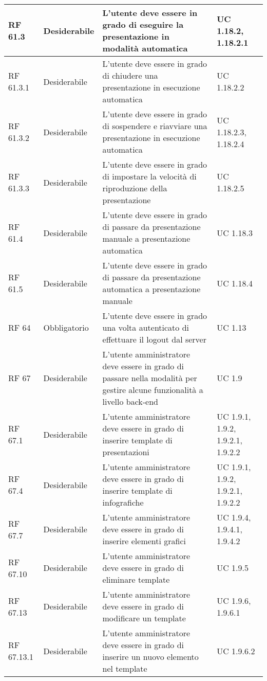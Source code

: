 {\begin{longtable} [c]{| p{2.5cm} | p{2.5cm} | p{6cm} |p{2.5cm}|}
			\hline
			RF 61.3 & Desiderabile & L'utente deve essere in grado di eseguire la presentazione in modalità automatica & UC 1.18.2, 1.18.2.1\\
			\hline
			RF 61.3.1 & Desiderabile & L'utente deve essere in grado di chiudere una presentazione in esecuzione automatica & UC 1.18.2.2\\
			\hline
			RF 61.3.2 & Desiderabile & L'utente deve essere in grado di sospendere e riavviare una presentazione in esecuzione automatica & UC 1.18.2.3, 1.18.2.4\\
			\hline
			RF 61.3.3 & Desiderabile & L'utente deve essere in grado di impostare la velocità di riproduzione della presentazione & UC 1.18.2.5\\
			\hline
			RF 61.4 & Desiderabile & L'utente deve essere in grado di passare da presentazione manuale a presentazione automatica & UC 1.18.3\\
			\hline
			RF 61.5 & Desiderabile & L'utente deve essere in grado di passare da presentazione automatica a presentazione manuale & UC 1.18.4\\
			\hline
			RF 64 & Obbligatorio & L'utente deve essere in grado una volta autenticato di effettuare il logout dal server & UC 1.13\\
			\hline
			RF 67 & Desiderabile & L'utente amministratore deve essere in grado di passare nella modalità per gestire alcune funzionalità a livello back-end & UC 1.9\\
			\hline
			RF 67.1 & Desiderabile & L'utente amministratore deve essere in grado di inserire template di presentazioni & UC 1.9.1, 1.9.2, 1.9.2.1, 1.9.2.2\\
			\hline
			RF 67.4 & Desiderabile & L'utente amministratore deve essere in grado di inserire template di infografiche & UC 1.9.1, 1.9.2, 1.9.2.1, 1.9.2.2\\
			\hline
			RF 67.7 & Desiderabile & L'utente amministratore deve essere in grado di inserire elementi grafici & UC 1.9.4, 1.9.4.1, 1.9.4.2\\
			\hline
			RF 67.10 & Desiderabile & L'utente amministratore deve essere in grado di eliminare template & UC 1.9.5\\
			\hline
			RF 67.13 & Desiderabile & L'utente amministratore deve essere in grado di modificare un template & UC 1.9.6, 1.9.6.1\\
			\hline
			RF 67.13.1 & Desiderabile & L'utente amministratore deve essere in grado di inserire un nuovo elemento nel template & UC 1.9.6.2\\

\end{longtable}}
